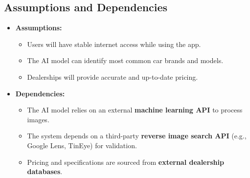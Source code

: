 \documentclass[]{article}
\begin{document}
\subsection{Assumptions and Dependencies}
\label{sub:assumptions_and_dependencies}
\begin{itemize}

	\item \textbf{Assumptions:}
    \begin{itemize}
        \item Users will have stable internet access while using the app.
        \item The AI model can identify most common car brands and models.
        \item Dealerships will provide accurate and up-to-date pricing.
    \end{itemize}
    \item \textbf{Dependencies:}
    \begin{itemize}
        \item The AI model relies on an external \textbf{machine learning API} to process images.
        \item The system depends on a third-party \textbf{reverse image search API} (e.g., Google Lens, TinEye) for validation.
        \item Pricing and specifications are sourced from \textbf{external dealership databases}.
    \end{itemize}

\end{itemize}
\end{document}
